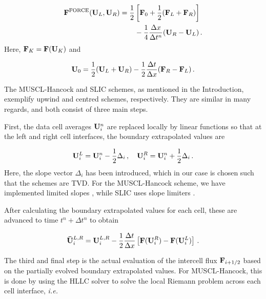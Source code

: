 \documentclass[final,3p,twocolumn]{elsarticle}
\begin{document}
\begin{align} 
    \nonumber 
    {\bf F}^{\rm FORCE}({\bf U}_L,{\bf U}_R) = \frac{1}{2}
    &\left[ {\bf F}_0 + \frac{1}{2} ({\bf F}_L + {\bf F}_{R})
    \right] \\
    \label{eq:FORCE} 
    &- \frac{1}{4} \frac{\Delta x}{\Delta t^n} ({\bf U}_{R} - {\bf
    U}_L) \,.  
\end{align}
%
Here, ${\bf F}_K = {\bf F}({\bf U}_K)$ and 

\begin{equation}
    \label{eq:richtmyer}
    {\bf U}_0 = \frac{1}{2}({\bf U}_L+{\bf U}_R) -
    \frac{1}{2} \frac{\Delta t}{\Delta x}({\bf F}_R - {\bf F}_L) \,.
\end{equation}

The MUSCL-Hancock \cite{van1979towards} and SLIC \cite{toro2000centred}
schemes, as mentioned in the Introduction, exemplify upwind and centred
schemes, respectively. They are similar in many regards, and both consist of
three main steps. 

First, the data cell averages ${\bf U}_i^n$ are replaced
locally by linear functions so that at the left and right cell interfaces, the
boundary extrapolated values are 

\begin{equation}
    \label{eq:BEV}
    {\bf U}_i^L = {\bf U}_i^n-\frac{1}{2}\Delta_i \,,\quad 
    {\bf U}_i^R = {\bf U}_i^n+\frac{1}{2}\Delta_i \,.
\end{equation}
%
Here, the slope vector $\Delta_i$ has been introduced, which in our case is
chosen such that the schemes are TVD. For the MUSCL-Hancock scheme, we have
implemented limited slopes \cite{anderson1986comparison}, while SLIC uses slope
limiters \cite{toro2000centred}. 

After calculating the boundary extrapolated values for each cell, these are
advanced to time $t^n+\Delta t^n$ to obtain

\begin{equation}
    \label{eq:evolution}
    {\bf \bar{U}}_i^{L,R} = {\bf U}_i^{L,R} - \frac{1}{2} \frac{\Delta
    t}{\Delta x} \left[ {\bf F}({\bf U}_i^R)-{\bf F}({\bf U}_i^L) \right] \,.
\end{equation}

The third and final step is the actual evaluation of the intercell flux ${\bf
F}_{i+1/2}$ based on the partially evolved boundary extrapolated values. For
MUSCL-Hancock, this is done by using the HLLC solver to solve the local Riemann
problem across each cell interface, \emph{i.e.~} 
\end{document}
